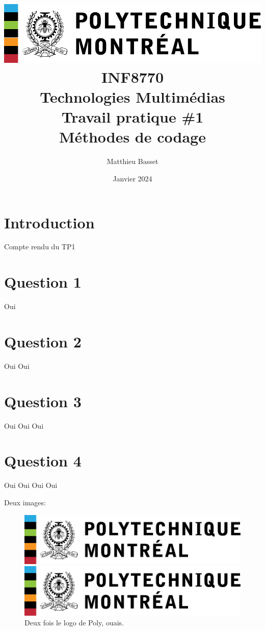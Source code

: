 \documentclass{article}[letterpaper, 11pt]
\title{
    \includegraphics[scale=0.8]{poly-logo.pdf}\\\vspace*{50pt}
    \huge\textbf{INF8770}\\
    \textbf{Technologies Multimédias}\\
    Travail pratique \#1\\
    Méthodes de codage\\
}
\author{\Large Matthieu Basset}
\date{\huge Janvier 2024}
\renewcommand{\thepage}{}
\begin{document}
\thispagestyle{empty}
\maketitle

\newpage

\renewcommand{\thepage}{\arabic{page}}
\pagestyle{fancy}
\renewcommand{\contentsname}{Table des matières}
\setcounter{page}{1}

\tableofcontents


\newpage

\section{Introduction}
Compte rendu du TP1
\newpage

\section{Question 1}
Oui
\newpage

\section{Question 2}
Oui Oui
\newpage

\section{Question 3}
Oui Oui Oui
\newpage

\section{Question 4}
Oui Oui Oui Oui

Deux images:

\begin{figure}[h]
	\begin{minipage}[c]{.49\linewidth}
		 \centering
		 \includegraphics[scale = 0.25]{poly-logo.pdf}
	\end{minipage}
	\begin{minipage}[c]{.49\linewidth}
		 \centering
		 \includegraphics[scale = 0.25]{poly-logo.pdf}
	\end{minipage}
		 \caption{ \centering Deux fois le logo de Poly, ouais.}
\end{figure}
\end{document}
